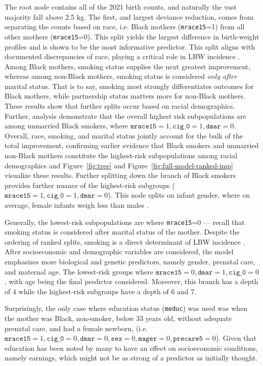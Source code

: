 The root node contains all of the 2021 birth counts, and naturally the vast majority fall above 2.5 kg. The first, and largest deviance reduction, comes from separating the counts based on race, i.e. Black mothers (\texttt{mrace15}=1) from all other mothers (\texttt{mrace15}=0). This split yields the largest difference in birth-weight profiles and is shown to be the most informative predictor. This split aligns with documented discrepancies of race, playing a critical role in LBW incidence \citep{kff_maternal_infant_health, pmc1751798}. Among Black mothers, smoking status supplies the next greatest improvement, whereas among non-Black mothers, smoking status is considered \emph{only after} marital status. That is to say, smoking most strongly differentiates outcomes for Black mothers, while partnership status matters more for non-Black mothers. These results show that further splits occur based on racial demographics. Further, analysis demonstrate that the overall highest risk subpopulations are among unmarried Black smokers, where \(\texttt{mrace15}=1,\texttt{cig\_0}=1, \texttt{dmar}=0\). Overall, race, smoking, and marital status jointly account for the bulk of the total improvement, confirming earlier evidence that Black smokers and unmarried non-Black mothers constitute the highest-risk subpopulations among racial demographics \citep{kff_maternal_infant_health,pmc1751798, smoking_lbw} and Figure~\ref{fig:tree} and Figure~\ref{fig:full-model-ranked-imp} visualize these results. Further splitting down the branch of Black smokers provides further nuance of the highest-risk subgroups (\(\texttt{mrace15}=1,\texttt{cig\_0}=1, \texttt{dmar}=0\)). This node splits on infant gender, where on average, female infants weigh less than males \citep{decreasing_sex_diff_birth_weight2009}. 

Generally, the lowest-risk subpopulations are where \texttt{mrace15}=0 — recall that smoking status is considered after marital status of the mother. Despite the ordering of ranked splits, smoking is a direct determinant of LBW incidence \citep{smoking_lbw}. After socioeconomic and demographic variables are considered, the model emphasizes more biological and genetic predictors, namely gender, prenatal care, and maternal age. The lowest-risk groups where \(\texttt{mrace15}=0, \texttt{dmar}=1,\texttt{cig\_0}=0\), with age being the final predictor considered. Moreover, this branch has a depth of 4 while the highest-risk subgroups have a depth of 6 and 7. 

Surprisingly, the only case where education status (\texttt{meduc}) was used was when the mother was Black, non-smoker, below 33 years old, without adequate prenatal care, and had a female newborn, (i.e. \(\texttt{mrace15} = 1, \texttt{cig\_0} = 0,\texttt{dmar}=0, \texttt{sex}=0, \texttt{mager}=0,\texttt{precare5}=0\)). Given that education has been noted by many \citep{edu_lbw} to have an effect on socioeconomic conditions, namely earnings, which might not be as strong of a predictor as initially thought.

